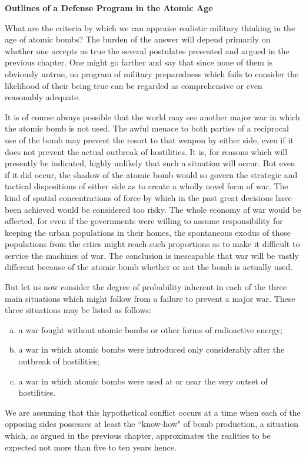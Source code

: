 \label{II-Retaliation2}

\vspace{12pt}

\noindent\textbf{Outlines of a Defense Program in the Atomic Age}

\vspace{10pt}

What are the criteria by which we can appraise realistic military thinking in the age of atomic bombs? The burden of the answer will depend primarily on whether one accepts as true the several postulates presented and argued in the previous chapter. One might go farther and say that since none of them is obviously untrue, no program of military preparedness which fails to consider the likelihood of their being true can be regarded as comprehensive or even reasonably adequate.

It is of course always possible that the world may see another major war in which the atomic bomb is not used. The awful menace to both parties of a reciprocal use of the bomb may prevent the resort to that weapon by either side, even if it does not prevent the actual outbreak of hostilities. It is, for reasons which will presently be indicated, highly unlikely that such a situation will occur. But even if it did occur, the shadow of the atomic bomb would so govern the strategic and tactical dispositions of either side as to create a
wholly novel form of war. The kind of spatial concentrations of force by which in the past great decisions have been achieved would be considered too risky. The whole economy of war would be affected, for even if the governments were willing to assume responsibility for keeping the urban populations in their homes, the spontaneous exodus of those populations from the cities might reach such proportions as to make it difficult to service the machines of war. The conclusion is inescapable that war will be vastly different because of the atomic bomb whether or not the bomb is actually used.

But let us now consider the degree of probability inherent in each of the three main situations which might follow from a failure to prevent a major war. These three situations may be listed as follows:
\begin{enumerate}[(a)]
\item a war fought without atomic bombs or other forms of radioactive energy;
\item a war in which atomic bombs were introduced only considerably after the outbreak of hostilities;
\item a war in which atomic bombs were used at or near the very outset of hostilities.
\end{enumerate}
\noindent We are assuming that this hypothetical conflict occurs at a time when each of the opposing sides possesses at least the ``know-how" of bomb production, a situation which, as argued in the previous chapter, approximates the realities to be expected not more than five to ten years hence.

